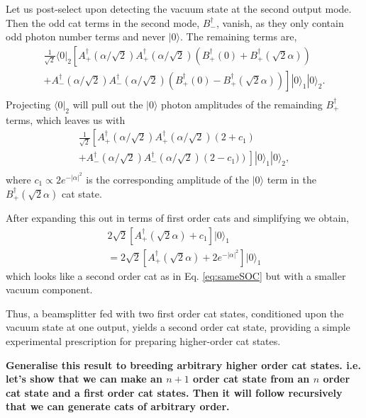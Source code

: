 \documentclass[aps,prl,twocolumn,amsmath,amssymb,nofootinbib,superscriptaddress]{revtex4}
\newcommand{\bra}[1]{\langle#1|}
\newcommand{\ket}[1]{|#1\rangle}
\begin{document}
Let us post-select upon detecting the vacuum state at the second output mode. Then the odd cat terms in the second mode, $B_-^\dag$, vanish, as they only contain odd photon number terms and never $\ket{0}$. The remaining terms are,
\begin{eqnarray}
\frac{1}{\sqrt{2}}\bra{0}_2\left[A_+^\dag(\alpha/\sqrt{2}) A_+^\dag(\alpha/\sqrt{2}) \left(B_+^\dag(0)+  B_+^\dag(\sqrt{2}\alpha)\right) \right.\nonumber \\
\left.+ A_-^\dag(\alpha/\sqrt{2}) A_-^\dag(\alpha/\sqrt{2})\left(B_+^\dag(0)-  B_+^\dag(\sqrt{2}\alpha)\right)\right]\ket{0}_1 \ket{0}_2 .\nonumber \\
\end{eqnarray}
Projecting $\bra{0}_2$ will pull out the $\ket{0}$ photon amplitudes of the remainding $B_+^{\dag}$ terms, which leaves us with
\begin{eqnarray}
\frac{1}{\sqrt{2}}\left[A_+^\dag(\alpha/\sqrt{2}) A_+^\dag(\alpha/\sqrt{2}) \left(2+ c_1\right) \right.\nonumber \\
\left.+ A_-^\dag(\alpha/\sqrt{2}) A_-^\dag(\alpha/\sqrt{2})\left(2-  c_1)\right)\right]\ket{0}_1 \ket{0}_2,\nonumber \\
\end{eqnarray}
where $c_1\propto2e^{-|\alpha|^2}$ is the corresponding amplitude of the $\ket{0}$ term in the $B_+^\dag(\sqrt{2}\alpha)$ cat state. 

After expanding this out in terms of first order cats and simplifying we obtain,
\begin{eqnarray}
2\sqrt{2}\left[A_+^\dag(\sqrt{2}\alpha)+c_1\right]\ket{0}_1 \nonumber \\
=2\sqrt{2}\left[A_+^\dag(\sqrt{2}\alpha)+2e^{-|\alpha|^2}\right]\ket{0}_1
\end{eqnarray}
which looks like a second order cat as in Eq. \ref{eq:sameSOC} but with a smaller vacuum component.

Thus, a beamsplitter fed with two first order cat states, conditioned upon the vacuum state at one output, yields a second order cat state, providing a simple experimental prescription for preparing higher-order cat states.

\textbf{Generalise this result to breeding arbitrary higher order cat states. i.e. let's show that we can make an $n+1$ order cat state from an $n$ order cat state and a first order cat states. Then it will follow recursively that we can generate cats of arbitrary order.}



\end{document}
